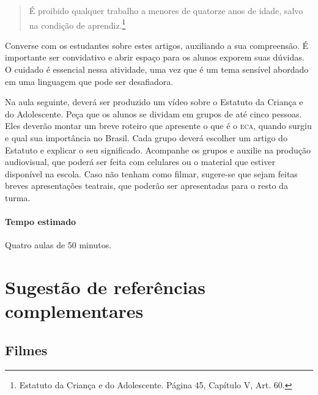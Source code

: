 \documentclass[11pt]{extarticle}
\begin{document}
\begin{quote}É proibido qualquer trabalho a menores de quatorze anos de idade, salvo na condição de aprendiz.\footnote{Estatuto da Criança e do Adolescente. Página 45, Capítulo V, Art. 60.}\end{quote} 

Converse com os estudantes sobre estes artigos, auxiliando a sua compreensão. É importante ser convidativo e abrir espaço para os alunos exporem suas dúvidas. O cuidado é essencial nessa atividade, uma vez que é um tema sensível abordado em uma linguagem que pode ser desafiadora.

Na aula seguinte, deverá ser produzido um vídeo sobre o Estatuto da Criança e do Adolescente. Peça que os alunos se dividam em grupos de até cinco pessoas. Eles deverão montar um breve roteiro que apresente o que é o \textsc{eca}, quando surgiu e qual sua importância no Brasil. Cada grupo deverá escolher um artigo do Estatuto e explicar o seu significado. Acompanhe os grupos e auxilie na produção audiovisual, que poderá ser feita com celulares ou o material que estiver disponível na escola. Caso não tenham como filmar, sugere-se que sejam feitas breves apresentações teatrais, que poderão ser apresentadas para o resto da turma.

\paragraph{Tempo estimado} Quatro aulas de 50 minutos.

\section{Sugestão de referências complementares}

\subsection{Filmes}
\end{document}
